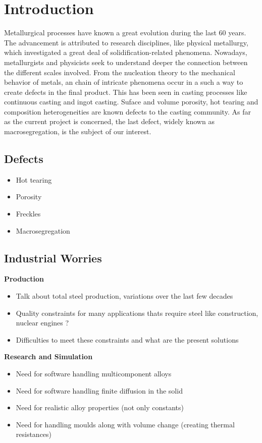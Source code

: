 \chapter*{Introduction}


Metallurgical processes have known a great evolution during the last 60 years. The advancement is attributed to 
research disciplines, like physical metallurgy, which investigated a great deal of solidification-related phenomena.
Nowadays, metallurgists and physicists seek to understand deeper the connection between the different scales involved.
From the nucleation theory to the mechanical behavior of metals, an chain of intricate phenomena occur in a such a way
to create defects in the final product. This has been seen in casting processes like continuous casting and ingot
casting. Suface and volume porosity, hot tearing and composition heterogeneities are known defects to the casting community.
As far as the current project is concerned, the last defect, widely known as macrosegregation, is the subject of our interest.

\section*{Defects}
\begin{itemize}
\item Hot tearing
\item Porosity
\item Freckles
\item Macrosegregation
\end{itemize}

\section*{Industrial Worries}
\textbf{Production}
\begin{itemize}
\item Talk about total steel production, variations over the last few decades
\item Quality constraints for many applications thats require steel like construction, nuclear engines ? 
\item Difficulties to meet these constraints and what are the present solutions
\end{itemize}
\textbf{Research and Simulation}
\begin{itemize}
\item Need for software handling multicomponent alloys
\item Need for software handling finite diffusion in the solid
\item Need for realistic alloy properties (not only constants)
\item Need for handling moulds along with volume change (creating thermal resistances)
\end{itemize}


